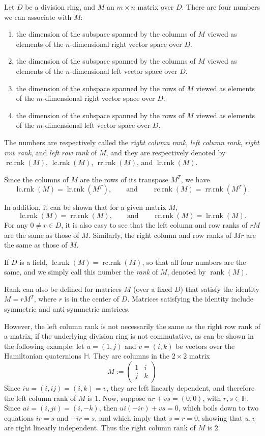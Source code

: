 \documentclass[12pt]{article}
\begin{document}
Let $D$ be a division ring, and $M$ an $m\times n$ matrix over $D$.  There are four numbers we can associate with $M$:
\begin{enumerate}
\item the dimension of the subspace spanned by the columns of $M$ viewed as elements of the $n$-dimensional right vector space over $D$.
\item the dimension of the subspace spanned by the columns of $M$ viewed as elements of the $n$-dimensional left vector space over $D$.
\item the dimension of the subspace spanned by the rows of $M$ viewed as elements of the $m$-dimensional right vector space over $D$.
\item the dimension of the subspace spanned by the rows of $M$ viewed as elements of the $m$-dimensional left vector space over $D$.
\end{enumerate}
The numbers are respectively called the \emph{right column rank}, \emph{left column rank}, \emph{right row rank}, and \emph{left row rank} of $M$, and they are respectively denoted by $\operatorname{rc.rnk}(M)$, $\operatorname{lc.rnk}(M)$, $\operatorname{rr.rnk}(M)$, and $\operatorname{lr.rnk}(M)$.

Since the columns of $M$ are the rows of its transpose $M^T$, we have
$$\operatorname{lc.rnk}(M)=\operatorname{lr.rnk}(M^T), \qquad \textrm{and} \qquad  \operatorname{rc.rnk}(M)=\operatorname{rr.rnk}(M^T).$$  

In addition, it can be shown that for a given matrix $M$, $$\operatorname{lc.rnk}(M)=\operatorname{rr.rnk}(M), \qquad \textrm{and} \qquad  \operatorname{rc.rnk}(M)=\operatorname{lr.rnk}(M).$$
For any $0\ne r\in D$, it is also easy to see that the left column and row ranks of $rM$ are the same as those of $M$.  Similarly, the right column and row ranks of $Mr$ are the same as those of $M$.

If $D$ is a field, $\operatorname{lc.rnk}(M)=\operatorname{rc.rnk}(M)$, so that all four numbers are the same, and we simply call this number the \emph{rank} of $M$, denoted by $\operatorname{rank}(M)$.  

Rank can also be defined for matrices $M$ (over a fixed $D$) that satisfy the identity $M=rM^T$, where $r$ is in the center of $D$.  Matrices satisfying the identity include symmetric and anti-symmetric matrices.

However, the left column rank is not necessarily the same as the right row rank of a matrix, if the underlying division ring is not commutative, as can be shown in the following example: let $u=(1,j)$ and $v=(i,k)$ be vectors over the Hamiltonian quaternions $\mathbb{H}$.  They are columns in the $2\times 2$ matrix
$$ M:=\begin{pmatrix}
1 & i \\
j & k
\end{pmatrix} $$
Since $iu=(i,ij)=(i,k)=v$, they are left linearly dependent, and therefore the left column rank of $M$ is $1$.  Now, suppose $ur+vs=(0,0)$, with $r,s\in \mathbb{H}$.  Since $ui=(i,ji)=(i,-k)$, then $ui(-ir)+vs=0$, which boils down to two equations $ir=s$ and $-ir=s$, and which imply that $s=r=0$, showing that $u,v$ are right linearly independent.  Thus the right column rank of $M$ is $2$.

\end{document}
